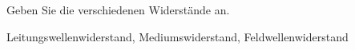 \begin{question}[section=3,name={Widerstand},difficulty=,quantity=,type=thr,tags={}]
	Geben Sie die verschiedenen Widerstände an.
	
	
\end{question}
\begin{solution}
	Leitungswellenwiderstand, Mediumswiderstand, Feldwellenwiderstand
\end{solution}
